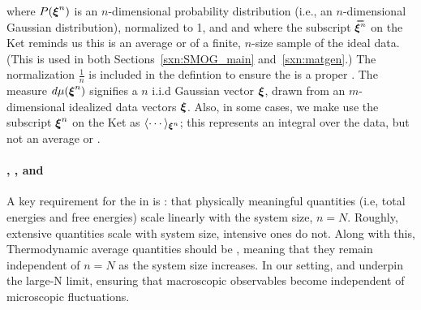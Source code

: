 where $P(\boldsymbol{\xi}^{n})$ is an $n$-dimensional
probability distribution (i.e., an $n$-dimensional Gaussian distribution), normalized to 1, and
and where the subscript $\AVGNDXIn$ on the Ket reminds us this is an average or \ExpectedValue of a finite, $n$-size sample of the ideal data.
(This is used in both Sections~\ref{sxn:SMOG_main} and~\ref{sxn:matgen}.)
The normalization $\tfrac{1}{n}$ is included in the defintion to ensure the \BraKet is a proper \ExpectedValue.
The measure $d\mu(\boldsymbol{\xi}^{n})$ signifies a $n$ i.i.d Gaussian vector $\boldsymbol{\xi}$, drawn from an $m$-dimensional idealized data vectors $\boldsymbol{\xi}$.
Also, in some cases, we make use the subscript $\boldsymbol{\xi}^{n}$ on the Ket as $\langle\cdots\rangle_{\boldsymbol{\xi}^{n}}$;  this represents an integral over the data, but not an average or \ExpectedValue.
%

\paragraph{\SizeExtensivity, \SizeIntensivity, and \SizeConsistency}
A key requirement for the \ThermodynamicLimit in \STATMECH is \emph{\SizeExtensivity}:
that physically meaningful quantities (i.e, total energies and free energies)
scale linearly with the system size, $n=N$.
Roughly, extensive quantities scale with system size, intensive ones do not.
Along with this, Thermodynamic average quantities should be \emph{\SizeIntensive},
meaning that they remain independent of $n=N$ as the system size increases.
In our setting, \SizeExtensivity and \SizeIntensivity underpin the large-N limit,
ensuring that macroscopic observables become independent of
microscopic fluctuations.

